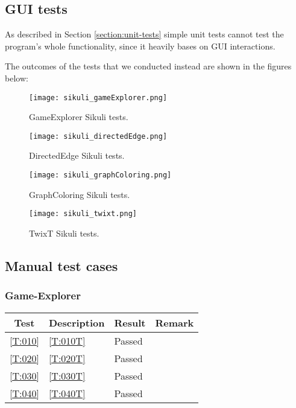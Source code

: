 \subsection{GUI tests}

As described in Section \ref{section:unit-tests} simple unit tests cannot test the program's whole functionality, since it heavily bases on GUI interactions.\par
The outcomes of the tests that we conducted instead are shown in the figures below:\par

\begin{figure}[!h]
	\texttt{[image: sikuli\_gameExplorer.png]}
	\caption{GameExplorer Sikuli tests.}
	\label{img:sikuliGameExplorer}
\end{figure}

\begin{figure}[!h]
	\texttt{[image: sikuli\_directedEdge.png]}
	\caption{DirectedEdge Sikuli tests.}
	\label{img:sikuliDirectedEdge}
\end{figure}

\begin{figure}[!h]
	\texttt{[image: sikuli\_graphColoring.png]}
	\caption{GraphColoring Sikuli tests.}
	\label{img:sikuliGraphColoring}
\end{figure}

\begin{figure}[!h]
	\texttt{[image: sikuli\_twixt.png]}
	\caption{TwixT Sikuli tests.}
	\label{img:sikuliTwixt}
\end{figure}

\subsection{Manual test cases}

\subsubsection{Game-Explorer}

\begin{tabular}{clll}
	\hline
	\textbf{Test} & \textbf{Description} & \textbf{Result} & \textbf{Remark} \\
	\hline
	\ref{T:010} & \ref{T:010T} & Passed & \\
	\ref{T:020} & \ref{T:020T} & Passed & \\
	\ref{T:030} & \ref{T:030T} & Passed & \\
	\ref{T:040} & \ref{T:040T} & Passed & \\
	\hline
\end{tabular}

